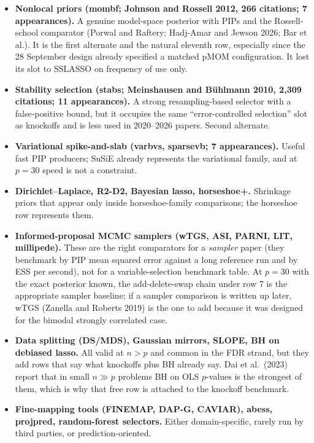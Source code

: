 \documentclass[11pt,letterpaper]{article}
\newcommand{\pkg}[1]{\textsf{#1}}
\begin{document}
\begin{itemize}
\item \textbf{Nonlocal priors (\pkg{mombf}; Johnson and Rossell 2012, 266 citations; 7 appearances).} A genuine model-space posterior with PIPs and the Rossell-school comparator (Porwal and Raftery; Hadj-Amar and Jewson 2026; Bar et al.). It is the first alternate and the natural eleventh row, especially since the 28 September design already specified a matched pMOM configuration. It lost its slot to SSLASSO on frequency of use only.
\item \textbf{Stability selection (\pkg{stabs}; Meinshausen and Bühlmann 2010, 2{,}309 citations; 11 appearances).} A strong resampling-based selector with a false-positive bound, but it occupies the same ``error-controlled selection'' slot as knockoffs and is less used in 2020--2026 papers. Second alternate.
\item \textbf{Variational spike-and-slab (\pkg{varbvs}, \pkg{sparsevb}; 7 appearances).} Useful fast PIP producers; SuSiE already represents the variational family, and at $p=30$ speed is not a constraint.
\item \textbf{Dirichlet--Laplace, R2-D2, Bayesian lasso, horseshoe+.} Shrinkage priors that appear only inside horseshoe-family comparisons; the horseshoe row represents them.
\item \textbf{Informed-proposal MCMC samplers (wTGS, ASI, PARNI, LIT, \pkg{millipede}).} These are the right comparators for a \emph{sampler} paper (they benchmark by PIP mean squared error against a long reference run and by ESS per second), not for a variable-selection benchmark table. At $p=30$ with the exact posterior known, the add-delete-swap chain under row 7 is the appropriate sampler baseline; if a sampler comparison is written up later, wTGS (Zanella and Roberts 2019) is the one to add because it was designed for the bimodal strongly correlated case.
\item \textbf{Data splitting (DS/MDS), Gaussian mirrors, SLOPE, BH on debiased lasso.} All valid at $n>p$ and common in the FDR strand, but they add rows that say what knockoffs plus BH already say. Dai et al.\ (2023) report that in small $n\gg p$ problems BH on OLS $p$-values is the strongest of them, which is why that free row is attached to the knockoff benchmark.
\item \textbf{Fine-mapping tools (FINEMAP, DAP-G, CAVIAR), \pkg{abess}, \pkg{projpred}, random-forest selectors.} Either domain-specific, rarely run by third parties, or prediction-oriented.
\end{itemize}
\end{document}
